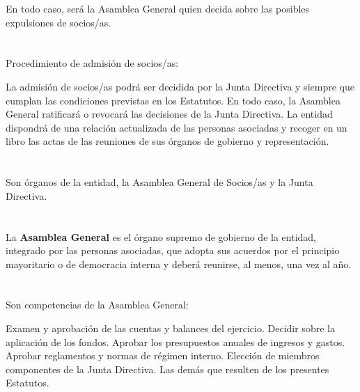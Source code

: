 \documentclass[draft]{estatutos}
\begin{document}
\begin{linenumbers}[1]
  En todo caso, será la Asamblea General quien decida sobre las posibles
  expulsiones de socios/as.

  \section{}
  Procedimiento de admisión de socios/as:

  \begin{enumerate}
  \sub La admisión de socios/as podrá ser decidida por la Junta Directiva y
      siempre que cumplan las condiciones previstas en los Estatutos.
  \sub En todo caso, la Asamblea General ratificará o revocará las decisiones
      de la Junta Directiva.
  \sub La entidad dispondrá de una relación actualizada de las personas
      asociadas y recoger en un libro las actas de las reuniones de sus órganos
      de gobierno y representación.
  \end{enumerate}


  \section{}
  Son órganos de la entidad, la Asamblea General de Socios/as y la Junta Directiva.

  \section{}
  La \textbf{Asamblea General} es el órgano supremo de gobierno de la entidad, integrado
  por las personas asociadas, que adopta sus acuerdos por el principio
  mayoritario o de democracia interna y deberá reunirse, al menos, una vez al
  año.

  \section{}
  Son competencias de la Asamblea General:

  \begin{enumerate}
  \sub Examen y aprobación de las cuentas y balances del ejercicio.
  \sub Decidir sobre la aplicación de los fondos.
  \sub Aprobar los presupuestos anuales de ingresos y gastos.
  \sub Aprobar reglamentos y normas de régimen interno.
  \sub Elección de miembros componentes de la Junta Directiva.
  \sub Las demás que resulten de los presentes Estatutos.
  \end{enumerate}


\end{linenumbers}
\end{document}
